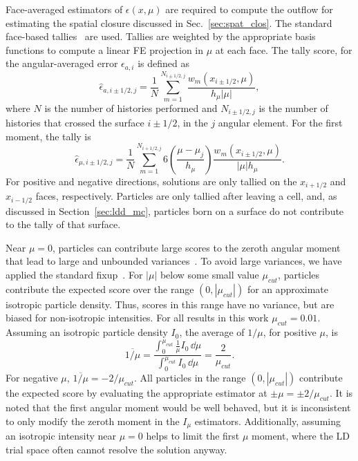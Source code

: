 Face-averaged estimators of $\epsilon(x,\mu)$ are required to compute the outflow for
estimating the spatial closure discussed in Sec.~\ref{sec:spat_clos}. The standard face-based
tallies~\cite{shultis_mc,favorite_faces} are used.  Tallies are weighted by
the appropriate basis functions to compute a linear FE projection in $\mu$ at each face.  The
tally score, for the angular-averaged error $\epsilon_{a,i}$ is defined as
\begin{equation}
    \hat \epsilon_{a,i\pm1/2,j} = \frac{1}{N} \sum_{m=1}^{N_{i\pm1/2,j}}
    \frac{w_m(x_{i\pm1/2},\mu)}{h_{\mu} |\mu|},
\end{equation}
where $N$ is the number of histories performed and $N_{i\pm1/2,j}$ is the number of histories
that crossed the surface $i\pm1/2$, in the $j$ angular element.   For the first
moment, the tally is
\begin{equation}\label{eq:face_mutally}
    \hat \epsilon_{\mu,i\pm1/2,j} = \frac{1}{N} \sum_{m=1}^{N_{i+1/2,j}} 
    6\left(\frac{\mu-\mu_j}{h_\mu}\right) \frac{w_m(x_{i\pm1/2},\mu)}{|\mu| h_{\mu}}.
\end{equation}
For positive and negative directions, solutions are only tallied
on the $x_{i+1/2}$ and $x_{i-1/2}$ faces, respectively. Particles are only tallied after leaving
a cell, and, as discussed in Section~\ref{sec:ldd_mc}, particles born on a surface do not contribute
to the tally of that surface.

Near $\mu=0$, particles can contribute large scores to the zeroth angular moment that lead to large and
unbounded variances~\cite{favorite_faces}.  To avoid large variances, we have applied the standard fixup~\cite{mcnp,favorite_faces}.  
For $|\mu|$ below some small value $\mu_{cut}$, 
particles contribute the expected score over the range $(0,|\mu_{cut}|)$ for an
approximate isotropic particle density. Thus, scores in this range have no variance, but are biased
for non-isotropic intensities.  For all results in this work $\mu_{cut}=0.01$.  Assuming
an isotropic particle density $I_0$, the average of
$1/\mu$, for positive $\mu$, is
\begin{equation}
    \overline{1/\mu} = \frac{\displaystyle \int_0^{\mu_{cut}}\frac{1}{\mu} I_0 \,\dd
\mu}{\displaystyle \int_0^{\mu_{cut}} I_0\, \dd \mu} =
    \frac{2}{\mu_{cut}}.
\end{equation}
For negative $\mu$, $\overline{1/\mu}=-2/\mu_{cut}$.
All particles in the range $(0,|\mu_{cut}|)$ contribute the expected score by evaluating
the appropriate estimator at $\pm\mu = \pm2/\mu_{cut}$.  It is noted that the first angular moment would be well behaved, but it is inconsistent to only modify the zeroth 
moment in the $I_\mu$ estimators. Additionally, assuming an isotropic intensity near $\mu=0$ helps to limit
the first $\mu$ moment, where the LD trial space often cannot resolve the solution anyway.


